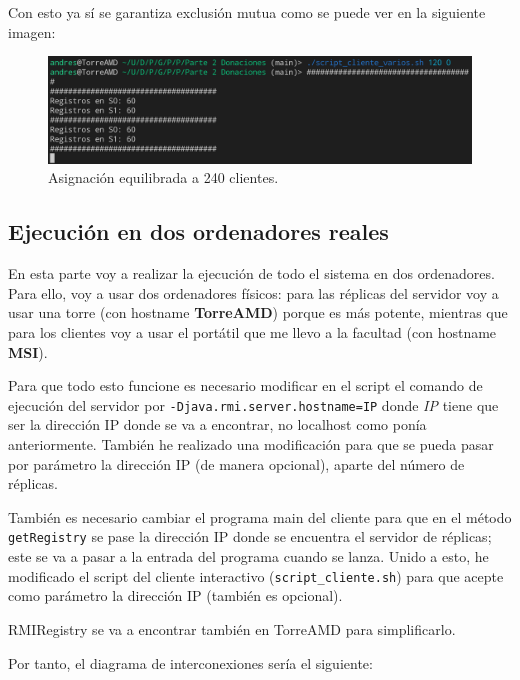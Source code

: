 \documentclass{article}
\begin{document}
Con esto ya sí se garantiza exclusión mutua como se puede ver en la siguiente imagen:

\begin{figure}[H]
    \centering
    \includegraphics[width=\textwidth]{imagenes/varios/correcto.png}
    \caption{Asignación equilibrada a 240 clientes.}
\end{figure}

\subsection{Ejecución en dos ordenadores reales}
En esta parte voy a realizar la ejecución de todo el sistema en dos ordenadores. Para ello, voy a usar dos ordenadores físicos: para las réplicas del servidor voy a usar una torre (con hostname \textbf{TorreAMD}) porque es más potente, mientras que para los clientes voy a usar el portátil que me llevo a la facultad (con hostname \textbf{MSI}).

\bigskip

Para que todo esto funcione es necesario modificar en el script el comando de ejecución del servidor por \verb|-Djava.rmi.server.hostname=IP| donde \textit{IP} tiene que ser la dirección IP donde se va a encontrar, no localhost como ponía anteriormente. También he realizado una modificación para que se pueda pasar por parámetro la dirección IP (de manera opcional), aparte del número de réplicas.

\bigskip

También es necesario cambiar el programa main del cliente para que en el método \verb|getRegistry| se pase la dirección IP donde se encuentra el servidor de réplicas; este se va a pasar a la entrada del programa cuando se lanza. Unido a esto, he modificado el script del cliente interactivo (\verb|script_cliente.sh|) para que acepte como parámetro la dirección IP (también es opcional).

\bigskip

RMIRegistry se va a encontrar también en TorreAMD para simplificarlo.

\bigskip

Por tanto, el diagrama de interconexiones sería el siguiente:
\end{document}
